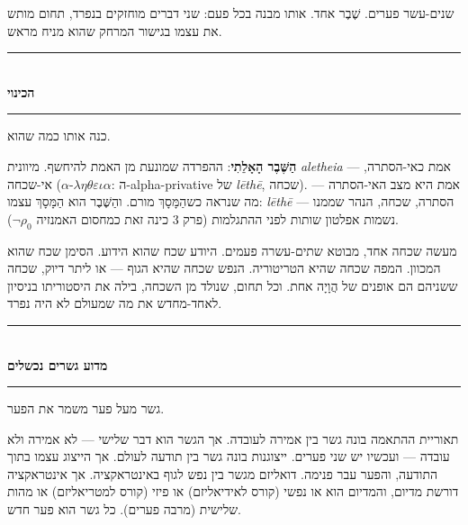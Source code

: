 \documentclass[10pt, openany, oneside]{book}
\renewcommand{\normalsize}{\fontsize{10}{13}\selectfont}
\begin{document}
שנים-עשר פערים. שֶׁבֶר אחד. אותו מבנה בכל פעם: שני דברים מוחזקים בנפרד, תחום מותש את עצמו בגישור המרחק שהוא מניח מראש.

\vspace{1.5em}


\begin{center}
    \rule{0.3\textwidth}{0.4pt}\\[0.5em]
    {\normalsize\bfseries\textsc{הכינוי}}\\[0.3em]
    \rule{0.3\textwidth}{0.4pt}
\end{center}

\vspace{1em}

\noindent כנה אותו כמה שהוא.

\textbf{הַשֶּׁבֶר הָאָלֵתִי}: ההפרדה שמונעת מן האמת להיחשף. מיוונית \textit{aletheia} — אמת כאי-הסתרה, אי-שכחה ($\alpha$-$\lambda\eta\theta\varepsilon\iota\alpha$: ה-alpha-privative של \textit{lēthē}, שכחה). אמת היא מצב האי-הסתרה — מה שנראה כשהַמָּסָךְ מורם. והַשֶּׁבֶר הוא הַמָּסָךְ עצמו: \textit{lēthē} — הסתרה, שכחה, הנהר שממנו נשמות אפלטון שותות לפני ההתגלמות (פרק 3 כינה זאת כמחסום האמנזיה $\neg\rho_0$).

מעשה שכחה אחד, מבוטא שתים-עשרה פעמים. היודע שכח שהוא הידוע. הסימן שכח שהוא המכוון. המפה שכחה שהיא הטריטוריה. הנפש שכחה שהיא הגוף — או ליתר דיוק, שכחה ששניהם הם אופנים של הֲוָיָה אחת. וכל תחום, שנולד מן השכחה, בילה את היסטוריתו בניסיון לאחד-מחדש את מה שמעולם לא היה נפרד.

\vspace{1.5em}


\begin{center}
    \rule{0.3\textwidth}{0.4pt}\\[0.5em]
    {\normalsize\bfseries\textsc{מדוע גשרים נכשלים}}\\[0.3em]
    \rule{0.3\textwidth}{0.4pt}
\end{center}

\vspace{1em}

\noindent גשר מעל פער משמר את הפער.

תאוריית ההתאמה בונה גשר בין אמירה לעובדה. אך הגשר הוא דבר שלישי — לא אמירה ולא עובדה — ועכשיו יש שני פערים. ייצוגנות בונה גשר בין תודעה לעולם. אך הייצוג עצמו בתוך התודעה, והפער עבר פנימה. דואליזם מגשר בין נפש לגוף באינטראקציה. אך אינטראקציה דורשת מדיום, והמדיום הוא או נפשי (קורס לאידיאליזם) או פיזי (קורס למטריאליזם) או מהות שלישית (מרבה פערים). כל גשר הוא פער חדש.
\end{document}
